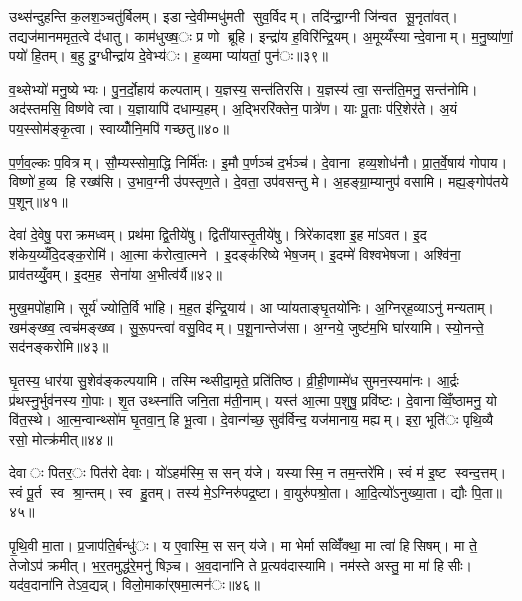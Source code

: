 उथ्स॑न्दुहन्ति क॒लश॒ञ्चतु॑र्बिलम्। इडान्दे॒वीम्मधु॑मती सुव॒र्विदम्। तदि॑न्द्रा॒ग्नी जि॑न्वत सू॒नृता॑वत्। तद्यज॑मानममृत॒त्वे द॑धातु। काम॑धुख्ष॒ः प्र णो ब्रूहि। इन्द्रा॑य ह॒विरि॑न्द्रि॒यम्। अ॒मूय्यँस्यान्दे॒वानाम्। म॒नु॒ष्या॑णां॒ पयो॑ हि॒तम्। ब॒हु दु॒ग्धीन्द्रा॑य दे॒वेभ्य॑ः। ह॒व्यमा प्या॑यतां॒ पुन॑ः॥३९॥

व॒थ्सेभ्यो॑ मनु॒ष्येभ्यः। पु॒न॒र्दो॒हाय॑ कल्पताम्। य॒ज्ञस्य॒ सन्त॑तिरसि। य॒ज्ञस्य॑ त्वा॒ सन्त॑ति॒मनु॒ सन्त॑नोमि। अद॑स्तमसि॒ विष्ण॑वे त्वा। य॒ज्ञायापि॑ दधाम्य॒हम्। अ॒द्भिररि॑क्तेन॒ पात्रे॑ण। याः पू॒ताः प॑रि॒शेर॑ते। अ॒यं पय॒स्सोम॑ङ्कृ॒त्वा। स्वाय्योँनि॒मपि॑ गच्छतु॥४०॥

प॒र्ण॒व॒ल्कः प॒वित्रम्। सौ॒म्यस्सोमा॒द्धि निर्मि॑तः। इ॒मौ प॒र्णञ्च॑ द॒र्भञ्च॑। दे॒वाना हव्य॒शोध॑नौ। प्रा॒त॒र्वे॒षाय॑ गोपाय। विष्णो॑ ह॒व्य हि रख्ष॑सि। उ॒भाव॒ग्नी उ॑पस्तृण॒ते। दे॒वता॒ उप॑वसन्तु मे। अ॒हङ्ग्रा॒म्यानुप॑ वसामि। मह्य॒ङ्गोप॑तये प॒शून्॥४१॥


देवा॑ दे॒वेषु॒ पराक्रमध्वम्। प्रथ॑मा द्वि॒तीये॑षु। द्विती॑यास्तृ॒तीये॑षु। त्रिरे॑कादशा इ॒ह मा॑ऽवत। इ॒द श॑केय॒य्यँदि॒दङ्क॒रोमि॑। आ॒त्मा क॑रोत्वा॒त्मने। इ॒दङ्क॑रिष्ये भेष॒जम्। इ॒दम्मे॑ विश्वभेषजा। अश्वि॑ना॒ प्राव॑तय्युँ॒वम्। इ॒दम॒ह सेना॑या अ॒भीत्व॑र्यै॥४२॥

मुख॒मपो॑हामि। सूर्य॑ ज्योति॒र्वि भा॑हि। म॒ह॒त इ॑न्द्रि॒याय॑। आ प्या॑यताङ्घृ॒तयो॑निः। अ॒ग्निर्‌ह॒व्याऽनु॑ मन्यताम्। खम॑ङ्ख्ष्व॒ त्वच॑मङ्ख्ष्व। सु॒रू॒पन्त्वा॑ वसु॒विदम्। प॒शू॒नान्तेज॑सा। अ॒ग्नये॒ जुष्ट॑म॒भि घा॑रयामि। स्यो॒नन्ते॒ सद॑नङ्करोमि॥४३॥

घृ॒तस्य॒ धार॑या सु॒शेव॑ङ्कल्पयामि। तस्मिन्थ्सीदा॒मृते॒ प्रति॑तिष्ठ। व्री॒ही॒णाम्मे॑ध सुमन॒स्यमा॑नः। आ॒र्द्रः प्र॑थस्नु॒र्भुव॑नस्य गो॒पाः। शृ॒त उथ्स्ना॑ति जनि॒ता म॑ती॒नाम्। यस्त॑ आ॒त्मा प॒शुषु॒ प्रवि॑ष्टः। दे॒वानाव्विँ॒ष्ठामनु॒ यो वि॑त॒स्थे। आ॒त्म॒न्वान्थ्सो॑म घृ॒तवा॒न्॒ हि भू॒त्वा। दे॒वान्ग॑च्छ॒ सुव॑र्विन्द॒ यज॑मानाय॒ मह्यम्। इरा॒ भूति॑ः पृथि॒व्यै रसो॒ मोत्क्र॑मीत्॥४४॥

देवाः पितर॒ः पित॑रो देवाः। यो॑ऽहम॑स्मि॒ स सन् य॑जे। यस्यास्मि॒ न तम॒न्तरे॑मि। स्वं म॑ इ॒ष्ट स्वन्द॒त्तम्। स्वं पू॒र्त स्व श्रा॒न्तम्। स्व हु॒तम्। तस्य॑ मे॒ऽग्निरु॑पद्र॒ष्टा। वा॒युरु॑पश्रो॒ता। आ॒दि॒त्यो॑ऽनुख्या॒ता। द्यौः पि॒ता॥४५॥

पृ॒थि॒वी मा॒ता। प्र॒जाप॑ति॒र्बन्धु॑ः। य ए॒वास्मि॒ स सन् य॑जे। मा भेर्मा सव्विँ॑क्था॒ मा त्वा॑ हिसिषम्। मा ते॒ तेजोऽप॑ क्रमीत्। भ॒र॒तमुद्ध॑रे॒मनु॑ षिञ़्च। अ॒व॒दाना॑नि ते प्र॒त्यव॑दास्यामि। नम॑स्ते अस्तु॒ मा मा॑ हिसीः। यद॑व॒दाना॑नि तेऽव॒द्यन्न्। विलो॒माका॑र्‌षमा॒त्मन॑ः॥४६॥

